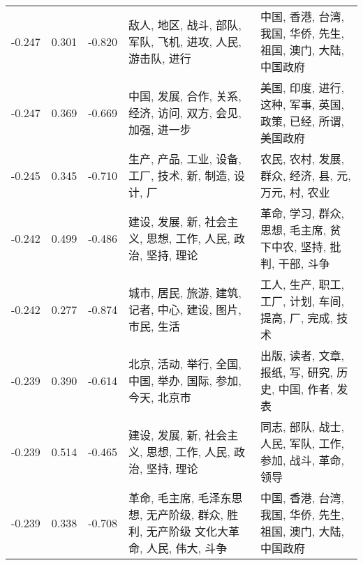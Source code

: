 \begin{tabular}{cccp{5cm}p{5cm}}
-0.247 & 0.301 & -0.820 & 敌人, 地区, 战斗, 部队, 军队, 飞机, 进攻, 人民, 游击队, 进行 & 中国, 香港, 台湾, 我国, 华侨, 先生, 祖国, 澳门, 大陆, 中国政府 \\
-0.247 & 0.369 & -0.669 & 中国, 发展, 合作, 关系, 经济, 访问, 双方, 会见, 加强, 进一步 & 美国, 印度, 进行, 这种, 军事, 英国, 政策, 已经, 所谓, 美国政府 \\
-0.245 & 0.345 & -0.710 & 生产, 产品, 工业, 设备, 工厂, 技术, 新, 制造, 设计, 厂 & 农民, 农村, 发展, 群众, 经济, 县, 元, 万元, 村, 农业 \\
-0.242 & 0.499 & -0.486 & 建设, 发展, 新, 社会主义, 思想, 工作, 人民, 政治, 坚持, 理论 & 革命, 学习, 群众, 思想, 毛主席, 贫下中农, 坚持, 批判, 干部, 斗争 \\
-0.242 & 0.277 & -0.874 & 城市, 居民, 旅游, 建筑, 记者, 中心, 建设, 图片, 市民, 生活 & 工人, 生产, 职工, 工厂, 计划, 车间, 提高, 厂, 完成, 技术 \\
-0.239 & 0.390 & -0.614 & 北京, 活动, 举行, 全国, 中国, 举办, 国际, 参加, 今天, 北京市 & 出版, 读者, 文章, 报纸, 写, 研究, 历史, 中国, 作者, 发表 \\
-0.239 & 0.514 & -0.465 & 建设, 发展, 新, 社会主义, 思想, 工作, 人民, 政治, 坚持, 理论 & 同志, 部队, 战士, 人民, 军队, 工作, 参加, 战斗, 革命, 领导 \\
-0.239 & 0.338 & -0.708 & 革命, 毛主席, 毛泽东思想, 无产阶级, 群众, 胜利, 无产阶级 文化大革命, 人民, 伟大, 斗争 & 中国, 香港, 台湾, 我国, 华侨, 先生, 祖国, 澳门, 大陆, 中国政府 \\
\bottomrule
\end{tabular}

